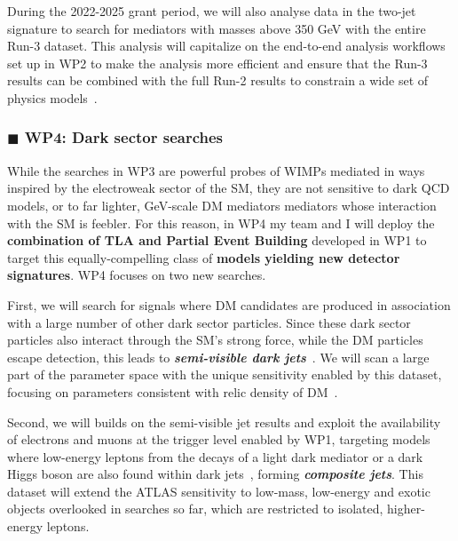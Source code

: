 \documentclass[11pt,a4paper]{article}
\begin{document}
During the 2022-2025 grant period, we will also analyse data in the two-jet signature to search for mediators with masses above 350 GeV with the entire Run-3 dataset. 
This analysis will capitalize on the end-to-end analysis workflows set up in WP2 to make the analysis more efficient and ensure that the Run-3 results can be combined with the full Run-2 results to constrain a wide set of physics models~\cite{Kim:2019rhy}.   

\subsubsection*{\color{orange} $\blacksquare$ \color{black} WP4: Dark sector searches}

While the searches in WP3 are powerful probes of WIMPs mediated in ways inspired by the electroweak sector of the SM, they are not sensitive to dark QCD models, or to far lighter, GeV-scale DM mediators mediators whose interaction with the SM is feebler. 
For this reason, in WP4 my team and I will deploy the \textbf{combination of TLA and Partial Event Building} developed in WP1 to target this equally-compelling class of \textbf{models yielding new detector signatures}. 
WP4 focuses on two new searches.  

First, we will search for signals where DM candidates are produced in association with a large number of other dark sector particles. 
Since these dark sector particles also interact through the SM's strong force, while the DM particles escape detection, this leads to \textbf{\textit{semi-visible dark jets}}~\cite{Cohen:2017pzm}.
We will scan a large part of the parameter space with the unique sensitivity enabled by this dataset, focusing on parameters consistent with relic density of DM~\cite{Bernreuther:2019pfb}. 

Second, we will builds on the semi-visible jet results and exploit the availability of electrons and muons at the trigger level enabled by WP1, targeting models where low-energy leptons from the decays of a light dark mediator or a dark Higgs boson are also found within dark jets~\cite{Curtin:2014cca,Falkowski:2010gv}, forming \textbf{\textit{composite  jets}}. %
This dataset will extend the ATLAS sensitivity to low-mass, low-energy and exotic objects overlooked in searches so far, which are restricted to isolated, higher-energy leptons. 
\end{document}
